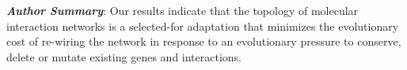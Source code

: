   \vspace{33pt}
{\noindent\textit{\textbf{Author Summary}}: Our results indicate that the topology of molecular interaction networks is a selected-for adaptation that minimizes the evolutionary cost of re-wiring the network in response to an evolutionary pressure to conserve, delete or mutate existing genes and interactions.}
